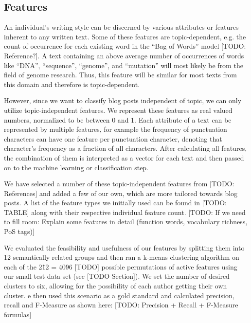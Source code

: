 \subsection{Features}
\label{sec:feautres}

An individual's writing style can be discerned by various attributes or features inherent to any written text.
Some of these features are topic-dependent, e.g. the count of occurrence for each existing word in the “Bag of Words” model [TODO: Reference?].
A text containing an above average number of occurrences of words like “DNA”, “sequence”, “genome”, and “mutation” will most likely be from the field of genome research.
Thus, this feature will be similar for most texts from this domain and therefore is topic-dependent.


However, since we want to classify blog posts independent of topic, we can only utilize topic-independent features.
We represent these features as real valued numbers, normalized to be between 0 and 1.
Each attribute of a text can be represented by multiple features, for example the frequency of punctuation characters can have one feature per punctuation character, denoting that character's frequency as a fraction of all characters.
After calculating all features, the combination of them is interpreted as a vector for each text and then passed on to the machine learning or classification step.


We have selected a number of these topic-independent features from [TODO: References] and added a few of our own, which are more tailored towards blog posts.
A list of the feature types we initially used can be found in [TODO: TABLE] along with their respective individual feature count.
[TODO: If we need to fill room: Explain some features in detail (function words, vocabulary richness, PoS tags)]


We evaluated the feasibility and usefulness of our features by splitting them into 12 semantically related groups and then ran a k-means clustering algorithm on each of the 2\^12 = 4096 [TODO] possible permutations of active features using our small test data set (see [TODO Section]).
We set the number of desired clusters to six, allowing for the possibility of each author getting their own cluster. 
e then used this scenario as a gold standard and calculated precision, recall and F-Measure as shown here: [TODO: Precision + Recall + F-Measure formulas]


